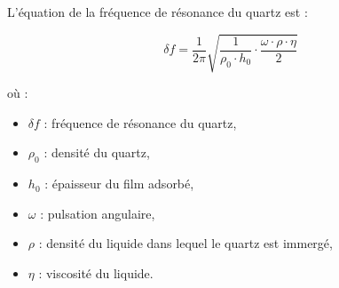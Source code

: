 L’équation de la fréquence de résonance du quartz est :

\begin{equation}
    \delta f = \frac{1}{2\pi} \sqrt{\frac{1}{\rho_0 \cdot h_0} \cdot \frac{\omega \cdot \rho \cdot \eta}{2}}
    \label{eq:frequence_resonance}
\end{equation}

où :
\begin{itemize}[label=\textbullet]
    \item $\delta f$ : fréquence de résonance du quartz,
    \item $\rho_0$ : densité du quartz,
    \item $h_0$ : épaisseur du film adsorbé,
    \item $\omega$ : pulsation angulaire,
    \item $\rho$ : densité du liquide dans lequel le quartz est immergé,
    \item $\eta$ : viscosité du liquide.
\end{itemize}